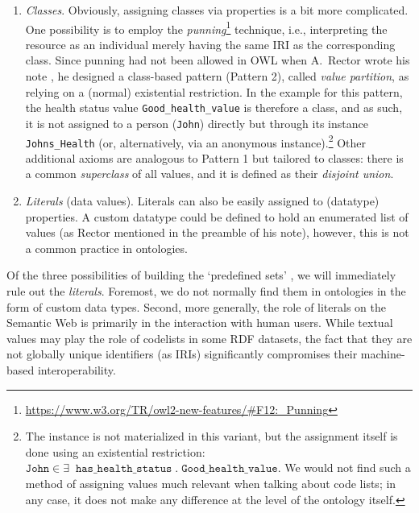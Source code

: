 \begin{enumerate}
    \item \emph{Classes}.
    Obviously, assigning classes via properties is a bit more complicated. 
    One possibility is to employ the \emph{punning}\footnote{\url{https://www.w3.org/TR/owl2-new-features/\#F12:\_Punning}} technique, i.e., interpreting the resource as an  individual merely having the same IRI as the corresponding class. 
    Since punning had not been allowed in OWL when A.~Rector wrote his note \cite{alanrector}, he designed a class-based pattern (Pattern 2), called \emph{value partition}, as relying on a (normal) existential restriction. In the example for this pattern, the health status value \texttt{Good\_health\_value} is therefore a class, and as such, it is not assigned to a person (\texttt{John}) directly but through its instance \texttt{Johns\_Health} (or, alternatively, via an anonymous instance).\footnote{The instance is not materialized in this variant, but the assignment itself is done using an existential restriction: $\texttt{John} \in \exists \; \; \texttt{has\_health\_status} \; . \; \texttt{Good\_health\_value}$. We would not find such a method of assigning values much relevant when talking about code lists; in any case, it does not make any difference at the level of the ontology itself.}
    Other additional axioms are analogous to Pattern 1 but tailored to classes: there is a common \emph{superclass} of all values, and it is defined as their \emph{disjoint union}.
    
    \item \emph{Literals} (data values).
    Literals can also be easily assigned to (datatype) properties.
    A custom datatype could be defined to hold an enumerated list of values (as Rector mentioned in the preamble of his note), however, this is not a common practice in ontologies.
\end{enumerate}

Of the three possibilities of building the `predefined sets' \cite{guide_code_list}, we will immediately rule out the \emph{literals}.
Foremost, we do not normally find them in ontologies in the form of custom data types.
Second, more generally, the role of literals on the Semantic Web is primarily in the interaction with human users. 
While textual values may play the role of codelists in some RDF datasets, the fact that they are not globally unique identifiers (as IRIs) significantly compromises their machine-based interoperability.

